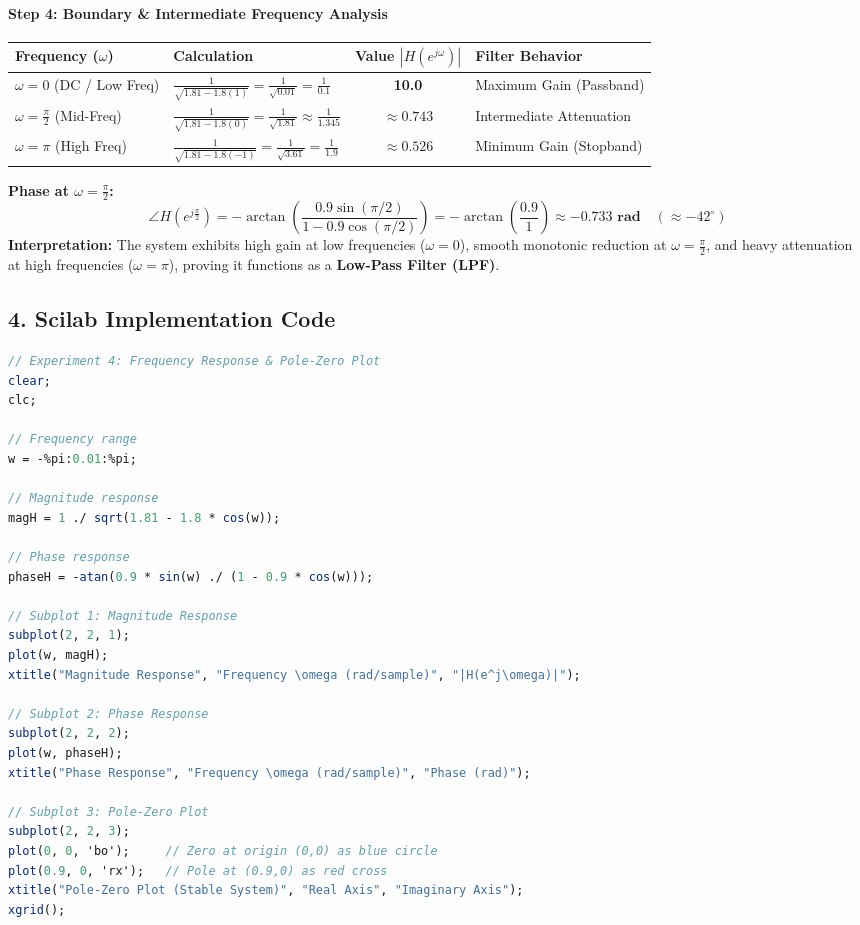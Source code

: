 \documentclass[11pt,a4paper]{article}
\begin{document}
\paragraph{Step 4: Boundary \& Intermediate Frequency Analysis}
\begin{center}
\begin{tabular}{@{}llcl@{}}
\toprule
\textbf{Frequency ($\omega$)} & \textbf{Calculation} & \textbf{Value $|H(e^{j\omega})|$} & \textbf{Filter Behavior} \\
\midrule
$\omega = 0$ (DC / Low Freq)    & $\frac{1}{\sqrt{1.81 - 1.8(1)}} = \frac{1}{\sqrt{0.01}} = \frac{1}{0.1}$     & \textbf{10.0}    & Maximum Gain (Passband) \\
$\omega = \frac{\pi}{2}$ (Mid-Freq) & $\frac{1}{\sqrt{1.81 - 1.8(0)}} = \frac{1}{\sqrt{1.81}} \approx \frac{1}{1.345}$ & \textbf{$\approx 0.743$} & Intermediate Attenuation \\
$\omega = \pi$ (High Freq)      & $\frac{1}{\sqrt{1.81 - 1.8(-1)}} = \frac{1}{\sqrt{3.61}} = \frac{1}{1.9}$    & \textbf{$\approx 0.526$} & Minimum Gain (Stopband) \\
\bottomrule
\end{tabular}
\end{center}
\textbf{Phase at $\omega = \frac{\pi}{2}$:}
\begin{equation}
    \angle H\left(e^{j\frac{\pi}{2}}\right) = -\arctan\left(\frac{0.9\sin(\pi/2)}{1 - 0.9\cos(\pi/2)}\right) = -\arctan\left(\frac{0.9}{1}\right) \approx \mathbf{-0.733\text{ rad}} \quad (\approx -42^\circ)
\end{equation}
\textbf{Interpretation:} The system exhibits high gain at low frequencies ($\omega=0$), smooth monotonic reduction at $\omega=\frac{\pi}{2}$, and heavy attenuation at high frequencies ($\omega=\pi$), proving it functions as a \textbf{Low-Pass Filter (LPF)}.

\subsection*{4. Scilab Implementation Code}
\begin{lstlisting}[language=Scilab]
// Experiment 4: Frequency Response & Pole-Zero Plot
clear;
clc;

// Frequency range
w = -%pi:0.01:%pi;

// Magnitude response
magH = 1 ./ sqrt(1.81 - 1.8 * cos(w));

// Phase response
phaseH = -atan(0.9 * sin(w) ./ (1 - 0.9 * cos(w)));

// Subplot 1: Magnitude Response
subplot(2, 2, 1);
plot(w, magH);
xtitle("Magnitude Response", "Frequency \omega (rad/sample)", "|H(e^j\omega)|");

// Subplot 2: Phase Response
subplot(2, 2, 2);
plot(w, phaseH);
xtitle("Phase Response", "Frequency \omega (rad/sample)", "Phase (rad)");

// Subplot 3: Pole-Zero Plot
subplot(2, 2, 3);
plot(0, 0, 'bo');     // Zero at origin (0,0) as blue circle
plot(0.9, 0, 'rx');   // Pole at (0.9,0) as red cross
xtitle("Pole-Zero Plot (Stable System)", "Real Axis", "Imaginary Axis");
xgrid();
\end{lstlisting}
\end{document}
